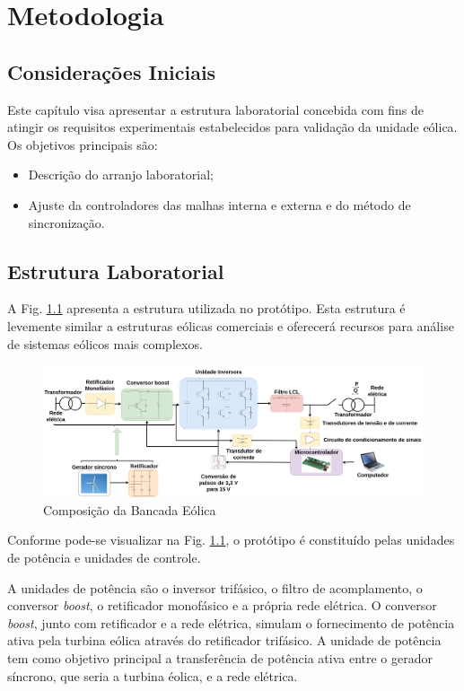 \chapter{Metodologia}

\section{Considerações Iniciais}

Este capítulo visa apresentar a estrutura laboratorial concebida com fins de atingir os requisitos experimentais estabelecidos para validação da unidade eólica.
Os objetivos principais são:
\begin{itemize}
	\item Descrição do arranjo laboratorial;
	\item Ajuste da controladores das malhas interna e externa e do método de sincronização. 
\end{itemize}

\section{Estrutura Laboratorial}

A Fig. \ref{fig:bancada-eolica} apresenta a estrutura utilizada no protótipo. Esta estrutura é levemente similar a estruturas eólicas comerciais e oferecerá recursos para análise de sistemas eólicos mais complexos.

\begin{figure}[!hbt]
	\begin{center}
    \includegraphics[scale=0.16]{figuras/Estrutura_Laboratorial.png}
    \caption{Composição da Bancada Eólica}
    \label{fig:bancada-eolica}
    \end{center}
\end{figure}

Conforme pode-se visualizar na Fig. \ref{fig:bancada-eolica}, o protótipo é constituído pelas unidades de potência e unidades de controle. 

A unidades de potência são o inversor trifásico, o filtro de acomplamento, o conversor \textit{boost}, o retificador monofásico e a própria rede elétrica. 
O conversor \textit{boost}, junto com retificador e a rede elétrica, simulam o fornecimento de potência ativa pela turbina eólica através do retificador trifásico.
A unidade de potência tem como objetivo principal a transferência de potência ativa entre o gerador síncrono, que seria a turbina éolica, e a rede elétrica.

